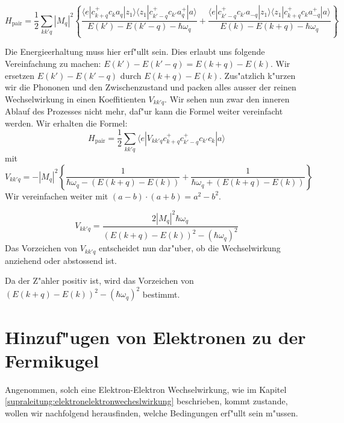 \begin{refsection}
\begin{equation}
H_{\text{pair}}=
\frac{1}{2}
\sum \limits_{kk'q} |M_q|^2
\left\{
\frac
{\langle e|c^+_{k+q} c_k a_q |z_1\rangle\langle z_1| c^+_{k'-q} c_{k'} a^+_q |a\rangle }
{E(k')-E(k'-q)-\hbar\omega_q}
+
\frac
{\langle e|c^+_{k'-q} c_{k'} a_{-q}|z_1\rangle\langle z_1| c^+_{k+q} c_k a^+_{-q} |a\rangle }
{E(k)-E(k+q)-\hbar\omega_q}
\right\}
\label{supraleitung:WechelwirkungME}
\end{equation}

Die Energieerhaltung muss hier erf"ullt sein. Dies erlaubt uns folgende Vereinfachung zu machen:
$E(k')-E(k'-q) = E(k+q)-E(k)$. Wir ersetzen $E(k')-E(k'-q)$ durch $E(k+q)-E(k)$.
Zus"atzlich k"urzen wir die Phononen und den Zwischenzustand und packen
alles ausser der reinen Wechselwirkung in einen Koeffitienten $V_{kk'q}$.
Wir sehen nun zwar den inneren Ablauf des Prozesses nicht mehr, daf"ur kann die Formel
weiter vereinfacht werden.
Wir erhalten die Formel:
\begin{equation}
H_{\text{pair}}=
\frac{1}{2}
\sum \limits_{kk'q} 
\langle e|V_{kk'q}c^+_{k+q}c^+_{k'-q}c_{k'}c_k|a \rangle
\label{supraleitung:WechelwirkungKurz}
\end{equation}
mit
\begin{equation}
V_{kk'q} = - |M_q|^2 \left\{
\frac{1}{\hbar\omega_q-(E(k+q)-E(k))}
+
\frac{1}{\hbar\omega_q+(E(k+q)-E(k))}
\right\}
\label{supraleitung:WechelwirkungVkk'q}
\end{equation}
Wir vereinfachen weiter mit $(a-b)\cdot (a+b) = a^2-b^2$.

\begin{equation}
V_{kk'q} =
\frac
{2|M_q|^2\hbar\omega_q}
{(E(k+q)-E(k))^2-(\hbar\omega_q)^2}
\label{supraleitung:Wechelwirkung_Vkk'q_Kurz}
\end{equation}
Das Vorzeichen von $V_{kk'q}$ entscheidet nun dar"uber, ob die Wechselwirkung
anziehend oder abstossend ist.

Da der Z"ahler positiv ist, wird das Vorzeichen von $(E(k+q)-E(k))^2-(\hbar\omega_q)^2$ bestimmt.

\section{Hinzuf"ugen von Elektronen zu der Fermikugel}
Angenommen, solch eine Elektron-Elektron Wechselwirkung, wie im Kapitel
\ref{supraleitung:elektronelektronwecheslwirkung} beschrieben, kommt zustande,
wollen wir nachfolgend herausfinden, welche Bedingungen erf"ullt sein m"ussen.


\end{refsection}
